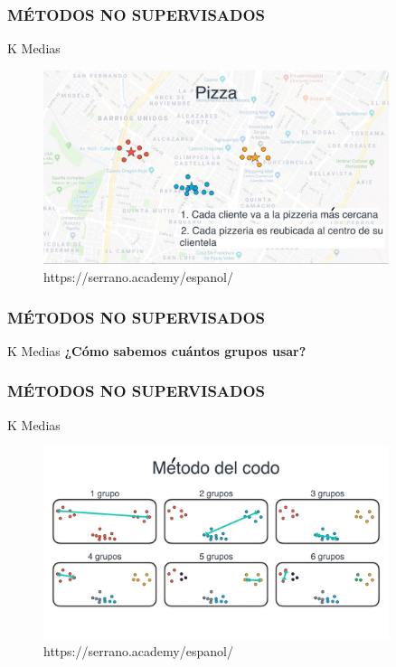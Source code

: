\documentclass{beamer}
\begin{document}
\begin{frame}
	\frametitle{MÉTODOS NO SUPERVISADOS}
	\begin{block}{K Medias}	
		\begin{figure}
			\includegraphics[width=0.9\textwidth]{Imagenes_k_means/IMG_3519.jpg}
			\caption{https://serrano.academy/espanol/}
		\end{figure}
	\end{block}
\end{frame}

\begin{frame}
	\frametitle{MÉTODOS NO SUPERVISADOS}
	\begin{block}{K Medias}	
	\textbf{	¿Cómo sabemos cuántos grupos usar?}
	\end{block}
\end{frame}

\begin{frame}
	\frametitle{MÉTODOS NO SUPERVISADOS}
	\begin{block}{K Medias}	
		\begin{figure}
			\includegraphics[width=0.9\textwidth]{Imagenes_k_means/IMG_3521.jpg}
			\caption{https://serrano.academy/espanol/}
		\end{figure}
	\end{block}
\end{frame}
\end{document}
